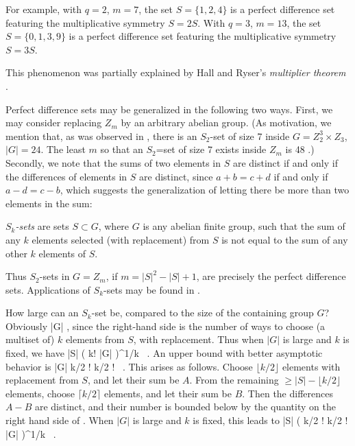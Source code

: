 For example,
with $q = 2$, $m = 7$, the set $S = \{ 1, 2, 4 \}$
is a perfect difference set featuring the multiplicative symmetry
$S = 2S$.
With $q = 3$, $m = 13$, the set $S = \{ 0 , 1 , 3 , 9 \}$
is a perfect difference set featuring the multiplicative symmetry
$S = 3S$.

This phenomenon was partially explained by Hall and Ryser's {\em multiplier
theorem} \cite[Theorem~11.4.1, p.~160 and Theorem~11.15.2, p.~166]{Hall86}.

Perfect difference sets may be generalized in the following two ways.
First, we may consider replacing $Z_m$ by an arbitrary abelian
group.
(As motivation, we mention that, as was observed in \cite{BSSS90},
there is an $S_2$-set of size 7 inside $G= Z_2^3 \times Z_3$,
$|G|=24$.
The least $m$ so that an $S_2$=set of size 7 exists
inside $Z_m$ is 48 \cite{Grah80A}.)
Secondly, we note that the sums of two elements in $S$ are distinct
if and only if the differences of elements in $S$ are distinct,
since $a + b = c + d$ if and only if $a-d = c-b$, which suggests the
generalization of letting there be more than two elements in the sum:

\begin{defn}\label{de2}
{\rm
{\em $S_k$-sets} are
sets $S \subset G$, where $G$ is any abelian finite group,
such that the sum of 
any $k$ elements selected (with replacement) from $S$
is not equal to the sum of any other
$k$ elements of $S$.
}
\end{defn}

Thus $S_2$-sets in $G = Z_m$, if $m = |S|^2 - |S|+1$, are
precisely the perfect difference sets.
Applications of $S_k$-sets may be found in \cite{Chun89,Klov81,Grah80,BSSS90}.

How large can an $S_k$-set be, compared to the size of
the containing group $G$? 
Obviously
|G| \ge {} ,
\eeq
since the right-hand side is the number of ways to choose (a multiset
of) $k$ elements from $S$, with replacement.
Thus when $|G|$ is large and $k$ is fixed, we have
|S| \precsim ( k! |G| )^{1/k} ~.
\eeq
An upper bound with better asymptotic behavior is
|G| \ge
{}
{\lfloor k/2 \rfloor ! \cdot \lceil k/2 \rceil !} ~.
\eeq
This arises as follows.
Choose
$\lfloor k/2 \rfloor$ elements with replacement from $S$,
and let their sum be $A$. From the
remaining $ \ge |S| - \lfloor k/2 \rfloor$
elements, choose $\lceil k/2 \rceil$ elements, and let their sum be
$B$.
Then the differences $A-B$ are distinct, and their number is bounded
below
by the quantity on the right hand side of .
When $|G|$ is large and $k$ is fixed, this leads to
|S|  \precsim
 ( \lfloor k/2 \rfloor ! \cdot
\lceil k/2 \rceil ! \cdot |G| )^{1/k} ~.
\eeq


